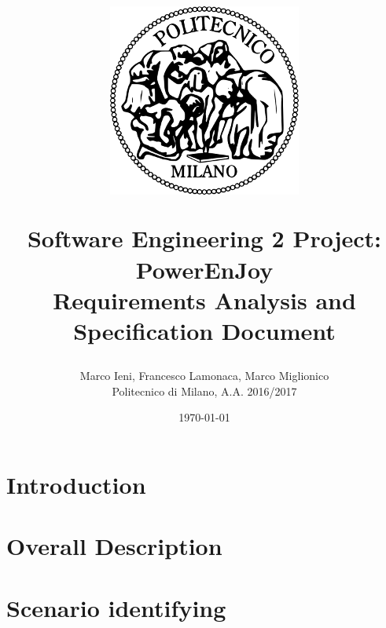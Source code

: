 \documentclass[a4paper, 12pt]{report}
\title{
	\begin{figure}[h]
		\centering
		\includegraphics{../common_resources/logo_polimi.png}
	\end{figure}
	\vspace{30px}
	Software Engineering 2 Project: PowerEnJoy \\ \vspace{1em}
	\textbf{R}equirements \textbf{A}nalysis and \textbf{S}pecification \textbf{D}ocument
}
\author{Marco Ieni, Francesco Lamonaca, Marco Miglionico\\Politecnico di Milano, A.A. 2016/2017}
\date{\today}
\begin{document}
\maketitle
\tableofcontents

\chapter{Introduction}
\label{ch:introduction}










\chapter{Overall Description}
\label{ch:overall_description}


\chapter{Scenario identifying}

\end{document}
